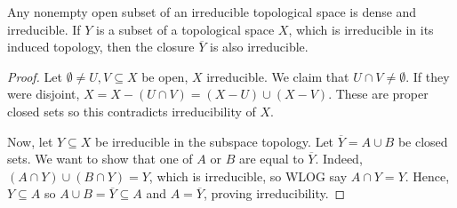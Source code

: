 \label{1.1.6}

Any nonempty open subset of an irreducible topological space is dense and
irreducible. If $Y$ is a subset of a topological space $X$, which is irreducible in its induced topology, then the closure $\overline{Y}$ is also irreducible.

\begin{proof}
    Let $\emptyset \neq U, V \subseteq X$ be open, $X$ irreducible. We claim that $U \cap V \neq \emptyset$. If they were disjoint, $X = X - (U \cap V) = (X - U) \cup (X - V)$. These are proper closed sets so this contradicts irreducibility of $X$.
    
    Now, let $Y \subseteq X$ be irreducible in the subspace topology. Let $\overline{Y} = A \cup B$ be closed sets. We want to show that one of $A$ or $B$ are equal to $\overline{Y}$. Indeed, $(A \cap Y) \cup (B \cap Y) = Y$, which is irreducible, so WLOG say $A \cap Y = Y$. Hence, $Y \subseteq A$ so $A \cup B = \overline{Y} \subseteq A$ and $A = \overline{Y}$, proving irreducibility.
\end{proof}